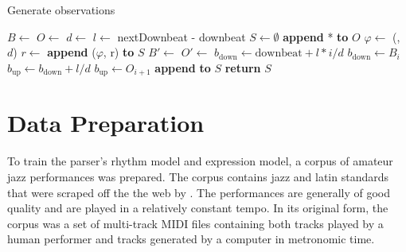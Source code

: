 \begin{algorithm}[h!]
\caption{Generate observations}
\label{alg:observations}
\begin{algorithmic}
	\State $B \leftarrow$ 
	\State $O \leftarrow$ 
	\State $d \leftarrow$ 
	\State $l \leftarrow$ nextDownbeat - downbeat
	\State $S \leftarrow \emptyset$
	\State \textbf{append} * \textbf{to} $O$
			\State $\varphi \leftarrow$ (, $d$)
			\State $r \leftarrow$ 
			\State \textbf{append} ($\varphi$, r) \textbf{to} $S$
		\EndIf	
		\State $B' \leftarrow$ 
		\State $O' \leftarrow$ 
			\State $b_{\mathrm{down}} \leftarrow \mathrm{downbeat} + l * i/d$
				\State $b_{\mathrm{down}} \leftarrow B_i$
			\EndIf
			\State $b_{\mathrm{up}} \leftarrow b_{\mathrm{down}} + l/d$
				\State $b_{\mathrm{up}} \leftarrow O_{i+1}$
			\EndIf
			\State \textbf{append}  \textbf{to} $S$
		\EndIf
	\EndFor
	\State \textbf{return} $S$
\EndFunction
\end{algorithmic}
\end{algorithm}








\section{Data Preparation}
\label{sec:corpus}

To train the parser's rhythm model and expression model, a corpus of amateur jazz performances was prepared. The corpus contains jazz and latin standards that were scraped off the the web by \citet{Wild:10}. The performances are generally of good quality and are played in a relatively constant tempo. In its original form, the corpus was a set of multi-track MIDI files containing both tracks played by a human performer and tracks generated by a computer in metronomic time.

